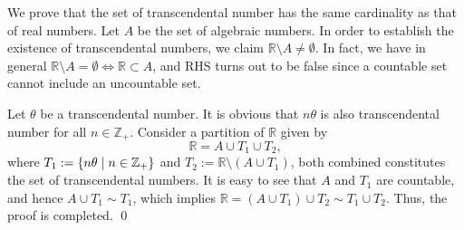 \documentclass[a4paper,12pt]{article}
\begin{document}
\begin{sol}
	We prove that the set of transcendental number has the same cardinality as that of real numbers.
	Let \( A \) be the set of algebraic numbers.
	In order to establish the existence of transcendental numbers,
	we claim \( \mathbb{R}\setminus A \neq \emptyset \).
	In fact, we have in general
	\( \mathbb{R}\setminus A = \emptyset  \Leftrightarrow \mathbb{R} \subset A\),
	and RHS turns out to be false since a countable set cannot include an uncountable set.
	
	Let \( \theta \) be a transcendental number.
	It is obvious that \( n \theta \) is also transcendental number for all \( n \in \mathbb{Z}_{+} \).
	Consider a partition of \( \mathbb{R} \) given by
	\begin{equation*}
		\mathbb{R} = A \cup T_1 \cup T_2,
	\end{equation*}
	where \( T_1:=\left\{ n \theta \;|\; n \in \mathbb{Z}_{+} \right\} \)
	and
	\( T_2:=\mathbb{R} \setminus (A \cup T_1) \),
	both combined constitutes the set of transcendental numbers.
	It is easy to see that
	\( A \) and \( T_1 \) are countable, and hence
	\( A \cup T_1 \sim T_1 \),
	which implies
	\( \mathbb{R} = (A \cup T_1) \cup T_2 \sim T_1 \cup T_2\).
	Thus, the proof is completed.
	\qed\end{sol}
\end{document}
